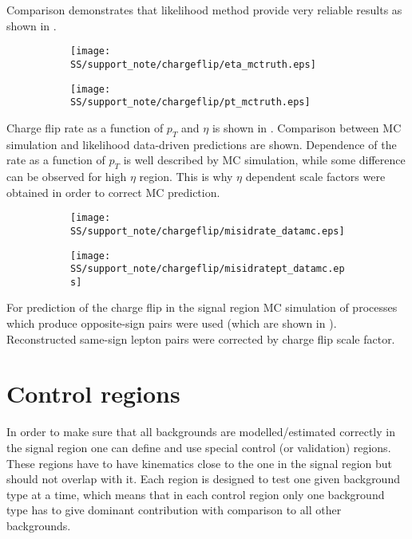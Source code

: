
Comparison demonstrates that likelihood method provide very reliable results as shown in
.

\begin{figure}
\begin{subfigure}{.5\textwidth}
  \centering
  \texttt{[image: SS/support\_note/chargeflip/eta\_mctruth.eps]}
\end{subfigure}%
\begin{subfigure}{.5\textwidth}
  \centering
  \texttt{[image: SS/support\_note/chargeflip/pt\_mctruth.eps]}
\end{subfigure}
\caption{\toDo}
\label{fig:likelihood_cross_check}
\end{figure}

Charge flip rate as a function of $p_T$ and $\eta$ is shown in .
Comparison between MC simulation and likelihood data-driven predictions are shown. 
Dependence of the rate as a function of $p_T$ is well described by MC simulation, while some difference can be observed
for high $\eta$ region. This is why $\eta$ dependent scale factors were obtained in order to correct MC prediction.

\begin{figure}
\begin{subfigure}{.5\textwidth}
  \centering
  \texttt{[image: SS/support\_note/chargeflip/misidrate\_datamc.eps]}
\end{subfigure}%
\begin{subfigure}{.5\textwidth}
  \centering
  \texttt{[image: SS/support\_note/chargeflip/misidratept\_datamc.eps]}
\end{subfigure}
\caption{\toDo}
\label{fig:charge_flip_data_vs_mc}
\end{figure}

For prediction of the charge flip in the signal region MC simulation of processes which produce opposite-sign pairs
were used (which are shown in ). Reconstructed same-sign lepton pairs were corrected by 
charge flip scale factor.

\section{Control regions}

In order to make sure that all backgrounds are modelled/estimated correctly in the signal region one can define and use special control (or validation) regions.
These regions have to have kinematics close to the one in the signal region but should not overlap with it. Each region is designed to test one given background type at a time,
which means that in each control region only one background type has to give dominant contribution with comparison to all other backgrounds.


